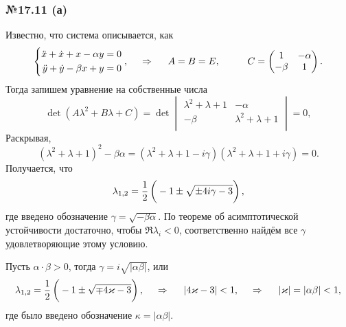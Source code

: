 


\subsubsection*{№17.11 (а)}

Известно, что система описывается, как
\begin{equation*}
    \left\{\begin{aligned}
        \ddot{x} + \dot{x} + x - \alpha y &= 0 \\
        \ddot{y} + \dot{y} - \beta x + y &= 0
    \end{aligned}\right.
    , \hspace{0.5cm} \Rightarrow \hspace{0.5cm}
    A = B = E, \hspace{1 cm}
    C = \begin{pmatrix}
        1 & -\alpha \\
        -\beta & 1 \\
    \end{pmatrix}.
\end{equation*}
Тогда запишем уравнение на собственные числа
\begin{equation*}
    \det\left(
        A \lambda^2 + B\lambda + C
    \right) = \det
    \begin{vmatrix}
        \lambda^2 + \lambda + 1 & -\alpha \\
        -\beta & \lambda^2+\lambda+1 \\
    \end{vmatrix} = 0,
\end{equation*}
Раскрывая,
\begin{equation*}
    (\lambda^2 + \lambda + 1)^2 - \beta \alpha = 
    \left(
        \lambda^2 + \lambda + 1 - i \gamma
    \right)
    \left(
        \lambda^2 + \lambda + 1 + i \gamma
    \right) = 0.
\end{equation*}
Получается, что
\begin{equation*}
    \lambda_{1, 2} = \frac{1}{2} \left(
        \vphantom{\frac{1}{2}}
        -1 \pm \sqrt{
        \pm 4 i \gamma - 3
        }
    \right),
\end{equation*}
где введено обозначение $\gamma = \sqrt{-\beta \alpha}$. По теореме об асимптотической устойчивости достаточно, чтобы $\Re \lambda_i < 0$, соответственно найдём все $\gamma$ удовлетворяющие этому условию.

Пусть $\alpha \cdot \beta > 0$, тогда $\gamma = i \sqrt{|\alpha \beta|}$, или
\begin{equation*}
    \lambda_{1, 2} = \frac{1}{2}\left(
    \vphantom{\frac{1}{2}}
    -1 \pm \sqrt{\mp 4 \kappa - 3}
    \right),
    \hspace{0.5cm} \Rightarrow \hspace{0.5cm}
    |4 \kappa - 3| < 1,
    \hspace{0.5cm} \Rightarrow \hspace{0.5cm}
    |\kappa| = |\alpha \beta | < 1,
\end{equation*}
где было введено обозначение $\kappa = |\alpha \beta|$.


